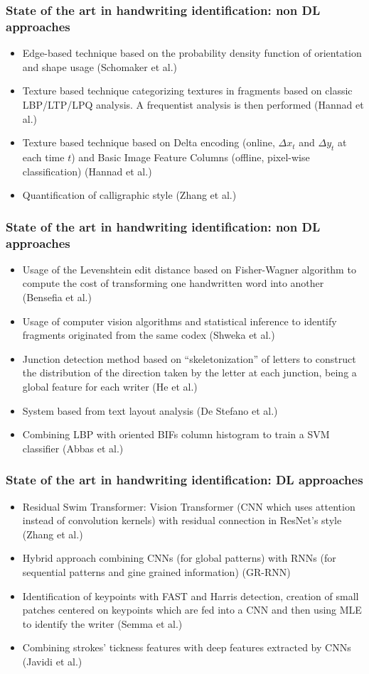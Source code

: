 \documentclass{beamer}
\begin{document}
\begin{frame}
	\frametitle{State of the art in handwriting identification: non DL approaches}
	\begin{itemize}
		\item Edge-based technique based on the probability density function of orientation and shape usage (Schomaker et al.)
		\item Texture based technique categorizing textures in fragments based on classic LBP/LTP/LPQ analysis. A frequentist analysis is then performed (Hannad et al.)
		\item Texture based technique based on Delta encoding (online, $\Delta x_{t}$ and $\Delta y_{t}$ at each time $t$) and Basic Image Feature Columns (offline, pixel-wise classification) (Hannad et al.)
		\item Quantification of calligraphic style (Zhang et al.)
	\end{itemize}
\end{frame}
\begin{frame}
	\frametitle{State of the art in handwriting identification: non DL approaches}
	\begin{itemize}
		\item Usage of the Levenshtein edit distance based on Fisher-Wagner algorithm to compute the cost of transforming one handwritten word into another (Bensefia et al.)
		\item Usage of computer vision algorithms and statistical inference to identify fragments originated from the same codex (Shweka et al.)
		\item Junction detection method based on ``skeletonization'' of letters to construct the distribution of the direction taken by the letter at each junction, being a global feature for each writer (He et al.)
		\item System based from text layout analysis (De Stefano et al.)
		\item Combining LBP with oriented BIFs column histogram to train a SVM classifier (Abbas et al.)
	\end{itemize}
\end{frame}
\begin{frame}
	\frametitle{State of the art in handwriting identification: DL approaches}
	\begin{itemize}
		\item Residual Swim Transformer: Vision Transformer (CNN which uses attention instead of convolution kernels) with residual connection in ResNet's style (Zhang et al.)
		\item Hybrid approach combining CNNs (for global patterns) with RNNs (for sequential patterns and gine grained information) (GR-RNN)
		\item Identification of keypoints with FAST and Harris detection, creation of small patches centered on keypoints which are fed into a CNN and then using MLE to identify the writer (Semma et al.)
		\item Combining strokes' tickness features with deep features extracted by CNNs (Javidi et al.)
	\end{itemize}
\end{frame}
\end{document}
